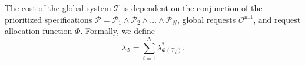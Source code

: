 The cost of the global system $\mathcal{T}$ is dependent on the conjunction of the prioritized specifications $\mathcal{P} = \mathcal{P}_1 \wedge \mathcal{P}_2 \wedge \dots \wedge \mathcal{P}_N$, global requests $\mathcal{O}^{\text{init}}$, and request allocation function $\Phi$. Formally, we define
\begin{equation}
    \lambda_{\Phi} = \sum_{i=1}^N\lambda_{\Phi(\mathcal{T}_i)}^*.
    \label{eq:global-cost}
\end{equation}










